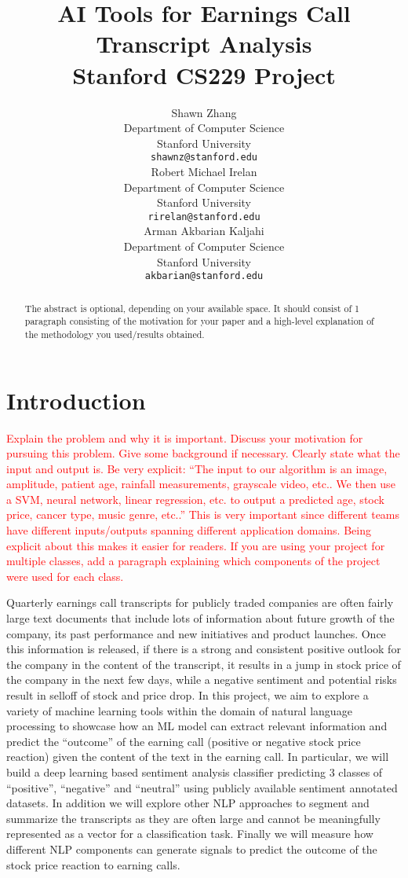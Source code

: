 \documentclass{article}
\title{
  AI Tools for Earnings Call Transcript Analysis \\
  \vspace{1em}
  \small{\normalfont Stanford CS229 Project}  %
}
\author{
  Shawn Zhang  \\
  Department of Computer Science \\
  Stanford University \\
  \texttt{shawnz@stanford.edu} \\
   \And
  Robert Michael Irelan \\
  Department of Computer Science \\
  Stanford University \\
  \texttt{rirelan@stanford.edu} \\
   \And
Arman Akbarian Kaljahi  \\
  Department of Computer Science \\
  Stanford University \\
  \texttt{akbarian@stanford.edu} \\
}
\begin{document}
\maketitle

\begin{abstract}
The abstract is optional, depending on your available space. It should consist of 1 paragraph consisting of the motivation for your paper and a high-level explanation of the methodology you used/results obtained.
\end{abstract}



\section{Introduction}
\textcolor{red}{
Explain the problem and why it is important. Discuss your motivation for pursuing this problem. Give some background if necessary. Clearly state what the input and output is. Be very explicit: “The input to our algorithm is an {image, amplitude, patient age, rainfall measurements, grayscale video, etc.}. We then use a {SVM, neural network, linear regression, etc.} to output a predicted {age, stock price, cancer type, music genre, etc.}.” This is very important since different teams have different inputs/outputs spanning different application domains. Being explicit about this makes it easier for readers. If you are using your project for multiple classes, add a paragraph explaining which components of the project were used for each class.}

Quarterly earnings call transcripts for publicly traded companies are often fairly large text documents that include lots of information about future growth of the company, its past performance and new initiatives and product launches. Once this information is released, if there is a strong and consistent positive outlook for the company in the content of the transcript, it results in a jump in stock price of the company in the next few days, while a negative sentiment and potential risks result in selloff of stock and price drop. In this project, we aim to explore a variety of machine learning tools within the domain of natural language processing to showcase how an ML model can extract relevant information and predict the “outcome” of the earning call (positive or negative stock price reaction) given the content of the text in the earning call. In particular, we will build a deep learning based sentiment analysis classifier predicting 3 classes of “positive”, “negative” and “neutral” using publicly available sentiment annotated datasets. In addition we will explore other NLP approaches to segment and summarize the transcripts as they are often large and cannot be meaningfully represented as a vector for a classification task. Finally we will measure how different NLP components can generate signals to predict the outcome of the stock price reaction to earning calls. 
\end{document}
